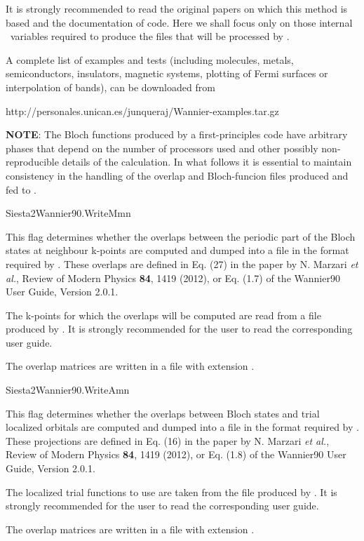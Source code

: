 It is strongly recommended to read the original papers on which this
method is based and the  documentation of  code.
Here we shall focus only on those internal \siesta\ variables
required to produce the files that will be processed
by .

A complete list of examples and tests (including molecules, metals, 
semiconductors, insulators, magnetic systems, plotting of Fermi surfaces
or interpolation of bands), can be downloaded from

 http://personales.unican.es/junqueraj/Wannier-examples.tar.gz

\textbf{NOTE}: The Bloch functions produced by a first-principles code
      have arbitrary phases that depend on the number of processors
      used and other possibly non-reproducible details of the
      calculation. In what follows it is essential to maintain
      consistency in the handling of the overlap and Bloch-funcion
      files produced and fed to .


\begin{fdflogicalF}{Siesta2Wannier90.WriteMmn}
        
  This flag determines whether the overlaps between the periodic part
  of the Bloch states at neighbour k-points are computed and dumped
  into a file in the format required by .  These
  overlaps are defined in Eq. (27) in the paper by N. Marzari
  \textit{et al.}, Review of Modern Physics \textbf{84}, 1419 (2012),
  or Eq. (1.7) of the Wannier90 User Guide, Version 2.0.1.

  The k-points for which the overlaps will be computed are read from a
   file produced by . It is strongly
  recommended for the user to read the corresponding user guide.

  The overlap matrices are written in a file with extension
  .

\end{fdflogicalF}

\begin{fdflogicalF}{Siesta2Wannier90.WriteAmn}
  
  This flag determines whether the overlaps between Bloch states and
  trial localized orbitals are computed and dumped into a file in the
  format required by .  These projections are
  defined in Eq. (16) in the paper by N. Marzari \textit{et al.},
  Review of Modern Physics \textbf{84}, 1419 (2012), or Eq. (1.8) of
  the Wannier90 User Guide, Version 2.0.1.

  The localized trial functions to use are taken from the
   file produced by . It is strongly
  recommended for the user to read the corresponding user guide.

  The overlap matrices are written in a file with extension
  .

\end{fdflogicalF}

